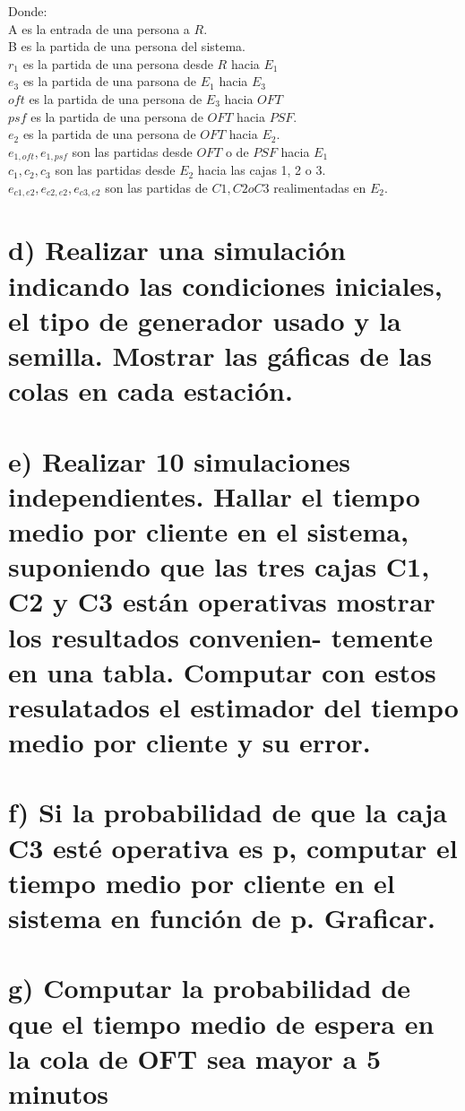 \documentclass{article}
\numberwithin{equation}{section}
\numberwithin{figure}{section}
\numberwithin{table}{section}
\begin{document}
Donde:\\
A es la entrada de una persona a $R$.\\
B es la partida de una persona del sistema. \\
$r_1$ es la partida de una persona desde $R$ hacia  $E_1$\\
$e_3$ es la partida de una parsona de $E_1$ hacia $E_3$ \\
$oft$ es la partida de una persona de $E_3$ hacia $OFT$\\
$psf$ es la partida de una persona de $OFT$ hacia $PSF$.\\
$e_2$ es la partida de una persona de $OFT$ hacia $E_2$.\\
$e_{1, oft}, e_{1, psf} $ son las partidas desde $OFT$ o de $PSF$ hacia $E_1$\\
$c_1, c_2, c_3$ son las partidas desde $E_2$ hacia las cajas 1, 2 o 3.\\
$e_{c1,e2}, e_{c2,e2}, e_{c3, e2} $ son las partidas de $C1, C2 o C3 $ realimentadas en $E_2$.\\





\section*{d)      Realizar una simulaci\'on indicando las condiciones iniciales, el tipo de generador usado y
la semilla. Mostrar las g\'aficas de las colas en cada estaci\'on.
}

\section*{e)     Realizar 10 simulaciones independientes. Hallar el tiempo medio por cliente en el sistema,
suponiendo que las tres cajas C1, C2 y C3 est\'an operativas mostrar los resultados convenien-
temente en una tabla. Computar con estos resulatados el estimador del tiempo medio por
cliente y su error.
}
\section*{f)    Si la probabilidad de que la caja C3 est\'e operativa es p, computar el tiempo medio por
cliente en el sistema en funci\'on de p. Graficar.
}
\section*{g)   Computar la probabilidad de que el tiempo medio de espera en la cola de OFT sea mayor
a 5 minutos
}
\end{document}

